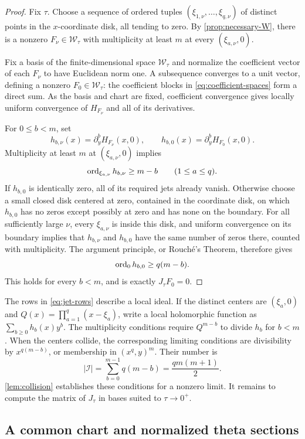 \begin{proof}
Fix $\tau$. Choose a sequence of ordered tuples $(\xi_{1,\nu},\ldots,\xi_{q,\nu})$ of distinct points in the $x$-coordinate disk, all tending to zero. By \cref{prop:necessary-W}, there is a nonzero $F_\nu\in\mathcal{W}_\tau$ with multiplicity at least $m$ at every $(\xi_{a,\nu},0)$.

Fix a basis of the finite-dimensional space $\mathcal{W}_\tau$ and normalize the coefficient vector of each $F_\nu$ to have Euclidean norm one. A subsequence converges to a unit vector, defining a nonzero $F_0\in\mathcal{W}_\tau$: the coefficient blocks in \eqref{eq:coefficient-spaces} form a direct sum. As the basis and chart are fixed, coefficient convergence gives locally uniform convergence of $H_{F_\nu}$ and all of its derivatives.

For $0\leq b<m$, set
\[
 h_{b,\nu}(x)=\partial_y^b H_{F_\nu}(x,0),
 \qquad h_{b,0}(x)=\partial_y^b H_{F_0}(x,0).
\]
Multiplicity at least $m$ at $(\xi_{a,\nu},0)$ implies
\[
 \operatorname{ord}_{\xi_{a,\nu}}h_{b,\nu}\geq m-b
 \qquad (1\leq a\leq q).
\]
If $h_{b,0}$ is identically zero, all of its required jets already vanish. Otherwise choose a small closed disk centered at zero, contained in the coordinate disk, on which $h_{b,0}$ has no zeros except possibly at zero and has none on the boundary. For all sufficiently large $\nu$, every $\xi_{a,\nu}$ is inside this disk, and uniform convergence on its boundary implies that $h_{b,\nu}$ and $h_{b,0}$ have the same number of zeros there, counted with multiplicity. The argument principle, or Rouch\'e's Theorem, therefore gives
\[
 \operatorname{ord}_0 h_{b,0}\geq q(m-b).
\]
This holds for every $b<m$, and is exactly $J_\tau F_0=0$.
\end{proof}

The rows in \eqref{eq:jet-rows} describe a local ideal. If the distinct centers are $(\xi_a,0)$ and $Q(x)=\prod_{a=1}^q(x-\xi_a)$, write a local holomorphic function as $\sum_{b\geq0}h_b(x)y^b$. The multiplicity conditions require $Q^{m-b}$ to divide $h_b$ for $b<m$. When the centers collide, the corresponding limiting conditions are divisibility by $x^{q(m-b)}$, or membership in $(x^q,y)^m$. Their number is
\[
 |\mathcal{I}|=\sum_{b=0}^{m-1}q(m-b)=\frac{qm(m+1)}2.
\]
\cref{lem:collision} establishes these conditions for a nonzero limit. It remains to compute the matrix of $J_\tau$ in bases suited to $\tau\to0^+$.

\subsection{A common chart and normalized theta sections}

